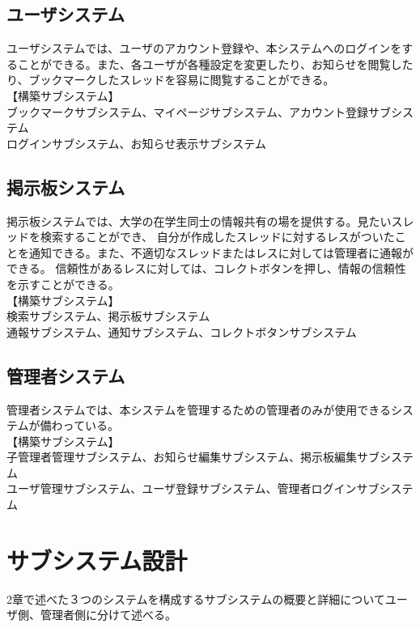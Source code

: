 \documentclass[a4j]{jarticle}
\begin{document}
\subsection{ユーザシステム}
 ユーザシステムでは、ユーザのアカウント登録や、本システムへのログインをすることができる。また、各ユーザが各種設定を変更したり、お知らせを閲覧したり、ブックマークしたスレッドを容易に閲覧することができる。
\\【構築サブシステム】
\\ ブックマークサブシステム、マイページサブシステム、アカウント登録サブシステム
\\ ログインサブシステム、お知らせ表示サブシステム

\subsection{掲示板システム}
 掲示板システムでは、大学の在学生同士の情報共有の場を提供する。見たいスレッドを検索することができ、
 自分が作成したスレッドに対するレスがついたことを通知できる。また、不適切なスレッドまたはレスに対しては管理者に通報ができる。
 信頼性があるレスに対しては、コレクトボタンを押し、情報の信頼性を示すことができる。
\\【構築サブシステム】
\\ 検索サブシステム、掲示板サブシステム
\\ 通報サブシステム、通知サブシステム、コレクトボタンサブシステム

\subsection{管理者システム}
 管理者システムでは、本システムを管理するための管理者のみが使用できるシステムが備わっている。
\\【構築サブシステム】
\\ 子管理者管理サブシステム、お知らせ編集サブシステム、掲示板編集サブシステム
\\ ユーザ管理サブシステム、ユーザ登録サブシステム、管理者ログインサブシステム

\section{サブシステム設計}
2章で述べた３つのシステムを構成するサブシステムの概要と詳細についてユーザ側、管理者側に分けて述べる。
\end{document}
